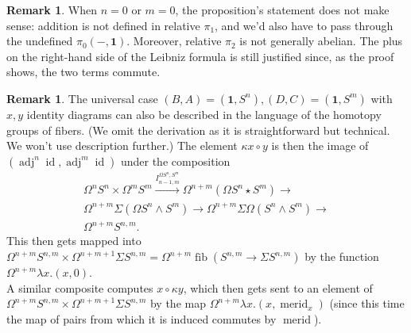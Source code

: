 \documentclass{amsart}
\theoremstyle{definition}
\newtheorem{re}[theorem]{Remark}
\newcommand{\id}{\operatorname{id}}
\newcommand{\merid}{\operatorname{merid}}
\newcommand{\fib}{\operatorname{fib}}
\newcommand{\adj}[1]{\operatorname{adj}^{#1}}
\newcommand{\sgtn}{\mathbf{1}}
\newcommand{\join}{\star}
\begin{document}
\begin{re}
    When $n=0$ or $m=0$, the proposition's statement does not make sense: addition is not defined in relative $\pi_1$, and we'd also have to pass through the undefined $\pi_0(-, \sgtn)$. Moreover, relative $\pi_2$ is not generally abelian. The plus on the right-hand side of the Leibniz formula is still justified since, as the proof shows, the two terms commute.
\end{re}


\begin{re}
    The universal case $(B, A) = (\sgtn, S^n), (D, C) = (\sgtn, S^{m})$ with $x,y$ identity diagrams can also be described in the language of the homotopy groups of fibers. (We omit the derivation as it is straightforward but technical. We won't use description further.) The element $\kappa x \circ y$ is then the image of $(\adj{n}\id, \adj{m}\id)$ under the composition
    \begin{align*}
        \Omega^{n}S^{n} \times \Omega^{m}S^{m} \xrightarrow{I_{n-1,m}^{\Omega S^n, S^m}} \Omega^{n+m}(\Omega S^{n} \join S^{m}) \to \\
        \Omega^{n+m} \Sigma (\Omega S^{n} \wedge S^{m})
        \to \Omega^{n+m} \Sigma \Omega (S^{n} \wedge S^{m}) \to \\
        \Omega^{n+m} S^{n, m}.
    \end{align*}
    This then gets mapped into $\Omega^{n+m} S^{n, m} \times \Omega^{n+m+1} \Sigma S^{n, m} = \Omega^{n+m} \fib (S^{n,m} \to \Sigma S^{n, m})$ by the function $\Omega^{n+m}\lambda x.(x, 0)$.
    \\
    A similar composite computes $x \circ \kappa y$, which then gets sent to an element of
    $\Omega^{n+m} S^{n, m} \times \Omega^{n+m+1} \Sigma S^{n, m}$ by the map $\Omega^{n+m}\lambda x.(x, \merid_x)$ (since this time the map of pairs from which it is induced commutes by $\merid$).


\end{re}
\end{document}
